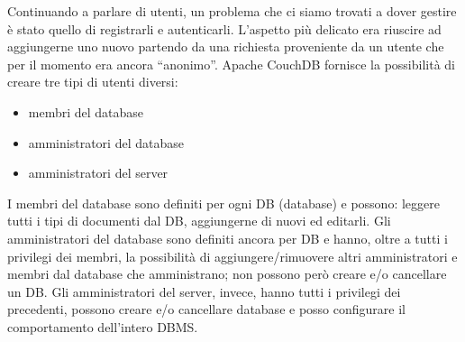 		Continuando a parlare di utenti, un problema che ci siamo trovati a
		dover gestire è stato quello di	registrarli e autenticarli. L'aspetto
		più delicato era riuscire ad aggiungerne uno nuovo partendo da una
		richiesta proveniente da un utente che per il momento era ancora ``anonimo''.
		Apache CouchDB\texttrademark{} fornisce la possibilità di creare tre
		tipi di utenti diversi:
		\begin{itemize}
			\item membri del database
			\item amministratori del database
			\item amministratori del server
		\end{itemize}
		I membri del database sono definiti per ogni DB (database) e possono:
		leggere tutti i tipi di documenti dal DB, aggiungerne di nuovi ed editarli.
		Gli amministratori del database sono definiti ancora per DB e hanno,
		oltre a tutti i privilegi dei membri, la possibilità di
		aggiungere/rimuovere altri amministratori e membri dal database che
		amministrano; non possono però creare e/o cancellare un DB.
		Gli amministratori del server, invece, hanno tutti i privilegi dei
		precedenti, possono creare e/o cancellare database e posso configurare
		il comportamento dell'intero DBMS.
		
